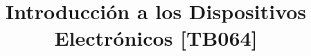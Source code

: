 \documentclass[10pt,a4paper,twocolumn]{article}
\title{\textbf{Introducción a los Dispositivos Electrónicos [TB064]}}
\begin{document}
\date{} 
\maketitle





\end{document}
